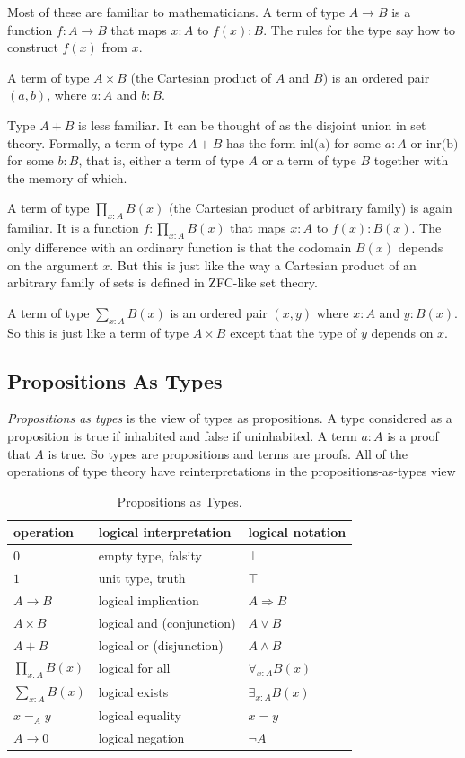 \documentclass[11pt]{article}
\begin{document}
Most of these are familiar to mathematicians.  A term of type $A \to B$
is a function $f : A \to B$ that maps $x : A$ to $f(x) : B$.  The rules
for the type say how to construct $f(x)$ from $x$.

A term of type $A \times B$ (the Cartesian product of $A$ and $B$) is an
ordered pair $(a, b)$, where $a : A$ and $b : B$.

Type $A + B$ is less familiar.  It can be thought of as the disjoint
union in set theory.  Formally, a term of type $A + B$ has the form
$\text{inl(a)}$ for some $a : A$ or
$\text{inr(b)}$ for some $b : B$, that is, either a term of type $A$ or a
term of type $B$ together with the memory of which.

A term of type $\prod_{x : A} B(x)$ (the Cartesian product of arbitrary family)
is again familiar.  It is a function $f : \prod_{x : A} B(x)$ that maps $x : A$
to $f(x) : B(x)$.  The only difference with an ordinary function is that
the codomain $B(x)$ depends on the argument $x$.
But this is just like the way a Cartesian product of an arbitrary family of
sets is defined in ZFC-like set theory.

A term of type $\sum_{x : A} B(x)$ is an ordered pair $(x, y)$ where $x : A$
and $y : B(x)$.  So this is just like a term of type $A \times B$ except that
the type of $y$ depends on $x$.

\subsection{Propositions As Types}

\emph{Propositions as types} is the view of types as propositions.
A type considered as a proposition is true if inhabited and false
if uninhabited.  A term $a : A$ is a proof that $A$ is true.
So types are propositions and terms are proofs.
All of the operations of type theory have reinterpretations in
the propositions-as-types view
\begin{table}
\begin{center}
\begin{tabular}{lll}
operation & logical interpretation & logical notation \\
\hline
$0$ & empty type, falsity & $\bot$ \\
$1$ & unit type, truth & $\top$ \\
$A \to B$ & logical implication & $A \Rightarrow B$ \\
$A \times B$ & logical and (conjunction) & $A \vee B$ \\
$A + B$ & logical or (disjunction) & $A \wedge B$ \\
$\prod_{x : A} B(x)$ & logical for all & $\forall_{x : A} B(x)$ \\
$\sum_{x : A} B(x)$ & logical exists & $\exists_{x : A} B(x)$ \\
$x =_A y$ & logical equality & $x = y$ \\
$A \to 0$ & logical negation & $\neg A$
\end{tabular}
\end{center}
\caption{Propositions as Types.}
\label{tab:propositions-as-types}
\end{table}
\end{document}
